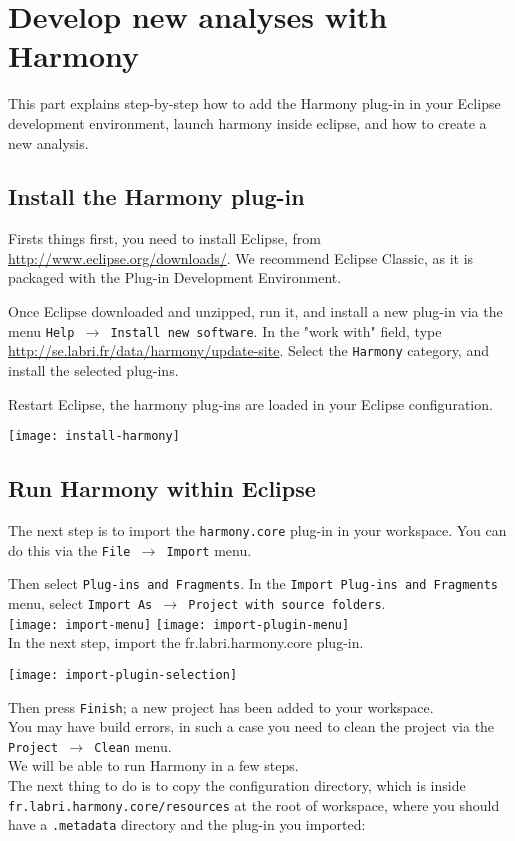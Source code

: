 \chapter{Develop new analyses with Harmony}\label{chap:DevelopNewAnalyses}

This part explains step-by-step how to add the Harmony plug-in in your Eclipse development environment, launch harmony inside eclipse, and how to create a new analysis.


\section{Install the Harmony plug-in}
Firsts things first, you need to install Eclipse, from \url{http://www.eclipse.org/downloads/}. We recommend Eclipse Classic, as it is packaged with the Plug-in Development Environment.

Once Eclipse downloaded and unzipped, run it, and install a new plug-in via the menu \texttt{Help $\rightarrow$ Install new software}. In the "work with" field, type \url{http://se.labri.fr/data/harmony/update-site}. Select the \texttt{Harmony} category, and install the selected plug-ins.

Restart Eclipse, the harmony plug-ins are loaded in your Eclipse configuration.

\texttt{[image: install-harmony]}

\section{Run Harmony within Eclipse}

The next step is to import the \texttt{harmony.core} plug-in in your workspace.
You can do this via the \texttt{File $\rightarrow$ Import} menu.

Then select \texttt{Plug-ins and Fragments}. In the \texttt{Import Plug-ins and Fragments} menu, select \texttt{Import As $\rightarrow$ Project with source folders}.\\

\noindent
\texttt{[image: import-menu]}
\texttt{[image: import-plugin-menu]}\\

In the next step, import the fr.labri.harmony.core plug-in.

\texttt{[image: import-plugin-selection]}

Then press \texttt{Finish}; a new project has been added to your workspace.\\
You may have build errors, in such a case you need to clean the project via the \texttt{Project $\rightarrow$ Clean} menu.\\
We will be able to run Harmony in a few steps.\\
The next thing to do is to copy the configuration directory, which is inside \texttt{fr.labri.harmony.core/resources} at the root of workspace, where you should have a \texttt{.metadata} directory and the plug-in you imported:\\


